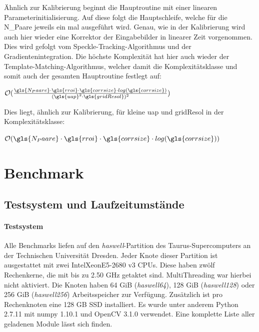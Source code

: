 Ähnlich zur Kalibrierung beginnt die Hauptroutine mit einer linearen Parameterinitialisierung. Auf diese folgt die Hauptschleife, welche für die \gls{N_Paare} jeweils ein mal ausgeführt wird. Genau, wie in der Kalibrierung wird auch hier wieder eine Korrektor der Eingabebilder in linearer Zeit vorgenommen. Dies wird gefolgt vom Speckle-Tracking-Algorithmus und der Gradientenintegration. Die höchste Komplexität hat hier auch wieder der Template-Matching-Algorithmus, welcher damit die Komplexitätsklasse und somit auch der gesamten Hauptroutine festlegt auf:

\begin{center}
	$\mathcal{O}(\frac{\gls{N_Paare} \cdot\gls{rroi} \cdot \gls{corrsize} \cdot log(\gls{corrsize})}{(\gls{uap}^2 \cdot \gls{gridResol})^2})$
\end{center}

Dies liegt, ähnlich zur Kalibrierung, für kleine \gls{uap} und \gls{gridResol} in der Komplexitätsklasse:

\begin{center}
	$\mathcal{O}(\gls{N_Paare} \cdot\gls{rroi} \cdot \gls{corrsize} \cdot log(\gls{corrsize}))$
\end{center}

\section{Benchmark}

\subsection{Testsystem und Laufzeitumstände}

\paragraph{Testsystem}

Alle Benchmarks liefen auf den \textit{haswell}-Partition des Taurus-Supercomputers an der Technischen Universität Dresden. Jeder Knote dieser Partition ist ausgestattet mit zwei Intel\textregistered Xeon\textregistered E5-2680 v3 \glspl{CPU}. Diese haben zwölf Rechenkerne, die mit bis zu 2.50 GHz getaktet sind. MultiThreading war hierbei nicht aktiviert. Die Knoten haben 64 GiB (\textit{haswell64}), 128 GiB (\textit{haswell128}) oder 256 GiB (\textit{haswell256}) Arbeitsspeicher zur Verfügung. Zusätzlich ist pro Rechenknoten eine 128 GB \gls{SSD} installiert. Es wurde unter anderem Python 2.7.11 mit numpy 1.10.1 und OpenCV 3.1.0 verwendet. Eine komplette Liste aller geladenen Module lässt sich  finden.

